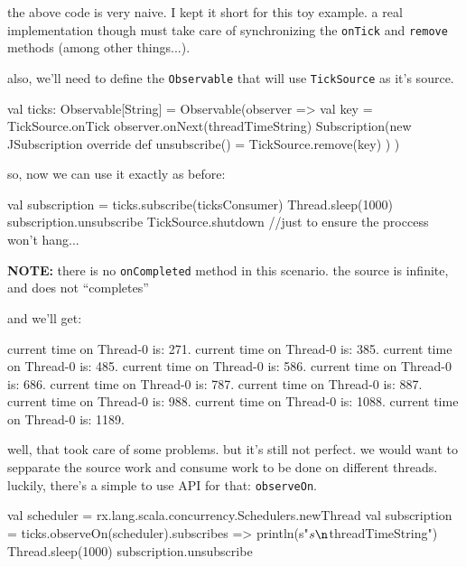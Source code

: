 \documentclass[8pt]{beamer}
\newcommand{\codeclass}[1]{\texttt{\textcolor[rgb]{0.4,0.85,0.9375}{#1}}}
\newcommand{\codemethod}[1]{\texttt{\textcolor[rgb]{0.457,0.4375,0.3667}{#1}}}
\newcommand{\codeobject}[1]{\texttt{\textcolor[rgb]{0.65,0.885,0.18}{#1}}}
\begin{document}
   the above code is very naive. I kept it short for this toy example.
  a real implementation though must take care of synchronizing the \codemethod{onTick} and \codemethod{remove} methods (among other things...).
  \newpage
  
  also, we'll need to define the \codeclass{Observable} that will use \codeobject{TickSource} as it's source.
  \begin{scalacode}
val ticks: Observable[String] = Observable(observer => {
  val key = TickSource.onTick {
    observer.onNext(threadTimeString)
  }
  Subscription(new JSubscription {
    override def unsubscribe() = TickSource.remove(key)
  })
})
  \end{scalacode}

  so, now we can use it exactly as before:
  \begin{scalacode}
val subscription = ticks.subscribe(ticksConsumer)
Thread.sleep(1000)
subscription.unsubscribe
TickSource.shutdown //just to ensure the proccess won't hang...
  \end{scalacode}
  \smallskip
  
  \textbf{NOTE:} there is no \codemethod{onCompleted} method in this scenario. the source is infinite, and does not ``completes''
  \newpage
  
  and we'll get:
  \begin{textcode}
current time on Thread-0 is: 271.
current time on Thread-0 is: 385.
current time on Thread-0 is: 485.
current time on Thread-0 is: 586.
current time on Thread-0 is: 686.
current time on Thread-0 is: 787.
current time on Thread-0 is: 887.
current time on Thread-0 is: 988.
current time on Thread-0 is: 1088.
current time on Thread-0 is: 1189.
  \end{textcode}
  \smallskip
  
  well, that took care of some problems. but it's still not perfect.
  we would want to sepparate the source work and consume work to be done on different threads.
  luckily, there's a simple to use API for that: \codemethod{observeOn}.
  \begin{scalacode}
val scheduler = rx.lang.scala.concurrency.Schedulers.newThread
val subscription = ticks.observeOn(scheduler).subscribe{s =>
  println(s"$s\n${threadTimeString}")
}
Thread.sleep(1000)
subscription.unsubscribe
  \end{scalacode}
  
\end{document}
